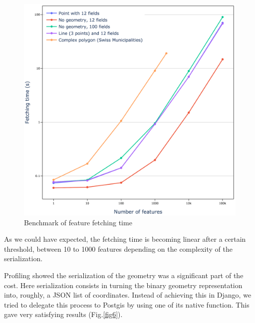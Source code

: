 \documentclass[runningheads]{llncs}
\begin{document}
\begin{figure}
	\includegraphics[width=\textwidth]{benchmarcka.png}
	\caption{Benchmark of feature fetching time} \label{fig5}
\end{figure}

As we could have expected, the fetching time is becoming linear after a certain threshold, between 10 to 1000 features depending on the complexity of the serialization.

Profiling showed the serialization of the geometry was a significant part of the cost. Here serialization consists in turning the binary geometry representation into, roughly, a JSON list of coordinates. Instead of achieving this in Django, we tried to delegate this process to Postgis by using one of its native function. This gave very satisfying results (Fig.\ref{fig6}).
\end{document}
